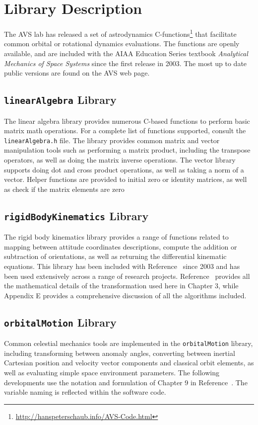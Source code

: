 



\section{Library Description}
The AVS lab has released a set of astrodynamics C-functions\footnote{\url{http://hanspeterschaub.info/AVS-Code.html}} that facilitate common orbital or rotational dynamics evaluations.  The functions are openly available, and are included with the AIAA Education Series textbook \emph{Analytical Mechanics of Space Systems}\cite{schaub} since the first release in 2003.  The most up to date public versions are found on the AVS web page.

\subsection{{\tt linearAlgebra} Library}
The linear algebra library provides numerous C-based functions to perform basic matrix math operations.  For a complete list of functions supported, consult the {\tt linearAlgebra.h} file.   The library provides common matrix and vector manipulation tools such as performing a matrix product, including the transpose operators, as well as doing the matrix inverse operations.  The vector library supports doing dot and cross product operations, as well as taking a norm of a vector.  Helper functions are provided to initial zero or identity matrices, as well as check if the matrix elements are zero





\subsection{{\tt rigidBodyKinematics} Library}
The rigid body kinematics library provides a range of functions related to mapping between attitude coordinates descriptions, compute the addition or subtraction of orientations, as well as returning the differential kinematic equations.  This library has been included with Reference~ since 2003 and has been used extensively across a range of research projects.  Reference~ provides all the mathematical details of the transformation used here in Chapter 3, while Appendix E provides a comprehensive discussion of all the algorithms included.



\subsection{{\tt orbitalMotion} Library}
Common celestial mechanics tools are implemented in the {\tt orbitalMotion} library, including transforming between anomaly angles, converting between inertial Cartesian position and velocity vector components and classical orbit elements, as well as evaluating simple space environment parameters.  The following developments use the notation and formulation of Chapter 9 in Reference~.  The variable naming is reflected within the software code.  


